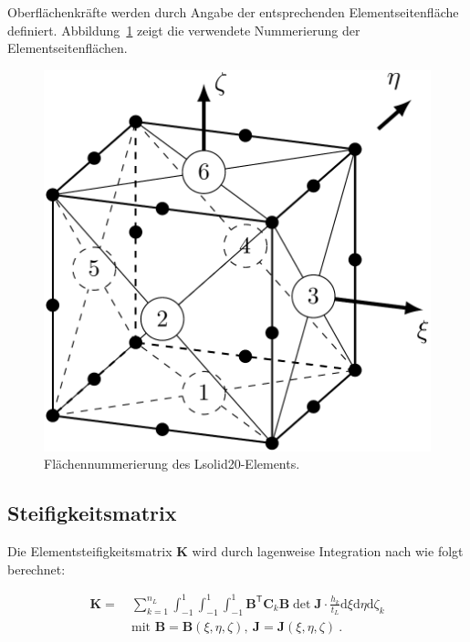 \documentclass[11pt,titlepage,listof=totoc,bibliography=totoc,twoside]{scrreprt}
\begin{document}
Oberflächenkräfte werden durch Angabe der entsprechenden Elementseitenfläche definiert. Abbildung~\ref{fig:lsolid20_flaechen} zeigt die verwendete Nummerierung der Elementseitenflächen.

\begin{figure}[htb]
\centering
\begin{center}
\includegraphics[scale=0.22]{Bilder/lsolid20_flaechen}
\end{center}
\caption{Flächennummerierung des Lsolid20-Elements.}
\label{fig:lsolid20_flaechen}
\end{figure}

\subsection{Steifigkeitsmatrix}

Die Elementsteifigkeitsmatrix $\mathbf{K}$ wird durch lagenweise Integration nach \cite{Panda1981} wie folgt berechnet:

\begin{equation}
\label{eq:layerwise_K}
\begin{split}
 \mathbf{K} = \: & \sum_{k=1}^{n_L} \int_{-1}^1 \int_{-1}^1 \int_{-1}^1 \mathbf{B}^\mathsf{T} \mathbf{C}_k \mathbf{B} \det \mathbf{J}  \cdot \frac{h_k}{t_L} \mathrm{d}\xi \mathrm{d}\eta \mathrm{d}\zeta_k \\
 & \text{mit } \mathbf{B} = \mathbf{B} \left( \xi, \eta, \zeta \right),\ \mathbf{J} = \mathbf{J} \left(\xi, \eta, \zeta \right) \ .
\end{split}
\end{equation}
\end{document}
